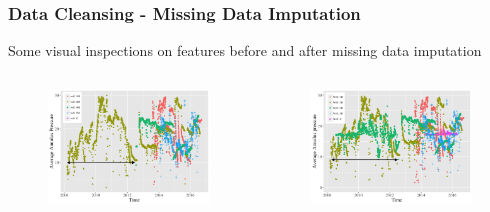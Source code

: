 \documentclass[xcolor=table]{beamer}
\begin{document}
\begin{frame}
\frametitle{Data Cleansing - Missing Data Imputation}
\begin{block}{}
Some visual inspections on features before and after missing data imputation
\end{block}

\begin{columns}[c]
\begin{figure}
\includegraphics[width=1\linewidth,left]{aap_t_copy.png} 
\end{figure}

\begin{figure}
\includegraphics[width=1\linewidth, right]{pre_aap_t.png}
\end{figure}
\end{columns}

\end{frame}
\end{document}
